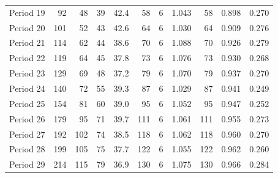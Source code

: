 \documentclass{article}
\theoremstyle{definition}
\begin{document}
\begin{table}[!hbtp]
{\begin{tabular}{lrrrrrrrrrr}
            Period 19 &       92 &       48 &                39 &              42.4 &                      58 &                          6 &       1.043 &             58 &       0.898 &             0.270 \\
            Period 20 &      101 &       52 &                43 &              42.6 &                      64 &                          6 &       1.030 &             64 &       0.909 &             0.276 \\
            Period 21 &      114 &       62 &                44 &              38.6 &                      70 &                          6 &       1.088 &             70 &       0.926 &             0.279 \\
            Period 22 &      119 &       64 &                45 &              37.8 &                      73 &                          6 &       1.076 &             73 &       0.930 &             0.268 \\
            Period 23 &      129 &       69 &                48 &              37.2 &                      79 &                          6 &       1.070 &             79 &       0.937 &             0.270 \\
            Period 24 &      140 &       72 &                55 &              39.3 &                      87 &                          6 &       1.029 &             87 &       0.941 &             0.249 \\
            Period 25 &      154 &       81 &                60 &              39.0 &                      95 &                          6 &       1.052 &             95 &       0.947 &             0.252 \\
            Period 26 &      179 &       95 &                71 &              39.7 &                     111 &                          6 &       1.061 &            111 &       0.955 &             0.273 \\
            Period 27 &      192 &      102 &                74 &              38.5 &                     118 &                          6 &       1.062 &            118 &       0.960 &             0.270 \\
            Period 28 &      199 &      105 &                75 &              37.7 &                     122 &                          6 &       1.055 &            122 &       0.962 &             0.260 \\
            Period 29 &      214 &      115 &                79 &              36.9 &                     130 &                          6 &       1.075 &            130 &       0.966 &             0.284 \\

\end{tabular}}
\end{table}
\end{document}
